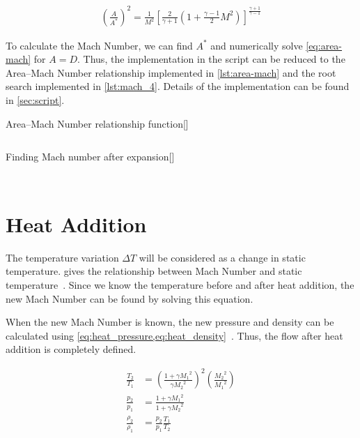 \documentclass[12pt, openright, oneside, a4paper, english]{unbtex}
\begin{document}
\begin{align}
    \label{eq:area-mach}
    \left( \frac{A}{A^*} \right)^2 = \frac{1}{M^2} \left[ \frac{2}{\gamma + 1} \left( 1 + \frac{\gamma - 1}{2} M^2 \right) \right]^{\frac{\gamma+1}{\gamma-1}}
\end{align}

To calculate the Mach Number, we can find \(A^*\) and numerically solve \cref{eq:area-mach} for \(A = D\). Thus, the implementation in the script can be reduced to the Area--Mach Number relationship implemented in \cref{lst:area-mach} and the root search implemented in \cref{lst:mach_4}. Details of the implementation can be found in \cref{sec:script}.

\begin{splitcode}[label=lst:area-mach]{Area--Mach Number relationship function}[]
    \inputminted{python}{listings/area-mach}
\end{splitcode}

\begin{splitcode}[label=lst:mach_4]{Finding Mach number after expansion}[]
    \inputminted{python}{listings/mach_4}
    \tcblower
    \inputminted{output}{listings/mach_4.o}
\end{splitcode}

\section{Heat Addition}

The temperature variation \(\Delta T\) will be considered as a change in static temperature.  gives the relationship between Mach Number and static temperature~\cite{anderson2021}. Since we know the temperature before and after heat addition, the new Mach Number can be found by solving this equation.

When the new Mach Number is known, the new pressure and density can be calculated using \cref{eq:heat_pressure,eq:heat_density}~\cite{anderson2021}. Thus, the flow after heat addition is completely defined.

\begin{align}
    \label{eq:heat}
    \frac{T_2}{T_1}       & = \left( \frac{1 + \gamma {M_1}^2}{\gamma {M_2}^2} \right)^2
    \left( \frac{{M_2}^2}{{M_1}^2} \right)
    \\
    \label{eq:heat_pressure}
    \frac{p_2}{p_1}       & = \frac{1 + \gamma {M_1}^2}{1 + \gamma {M_2}^2}
    \\
    \label{eq:heat_density}
    \frac{\rho_2}{\rho_1} & = \frac{p_2}{p_1} \frac{T_1}{T_2}
\end{align}
\end{document}
